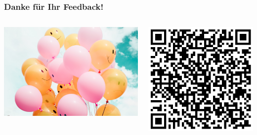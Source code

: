 \documentclass{beamer}
\begin{document}

\begin{frame}
\frametitle{Danke für Ihr Feedback!}

\begin{columns}[c]

\begin{column}{6cm}
\begin{center}
 \includegraphics[width=\textwidth]{smilie_balloons.jpg}
\end{center}

\end{column}

\begin{column}{4cm}


\begin{center}
\includegraphics[width=\textwidth]{feedback_QR.png}
\end{center}
\end{column}


\end{columns}
\end{frame}
\end{document}
